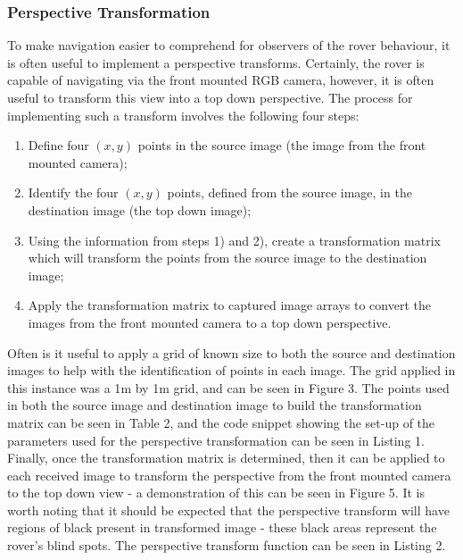 \documentclass[a4paper]{article}
\begin{document}
\subsubsection{Perspective Transformation}
To make navigation easier to comprehend for observers of the rover behaviour, it is often useful to implement a perspective transforms. Certainly, the rover is capable of navigating via the front mounted RGB camera, however, it is often useful to transform this view into a top down perspective. The process for implementing such a transform involves the following four steps:
\begin{enumerate}
\item Define four $(x,y)$ points in the source image (the image from the front mounted camera);
\item Identify the four $(x,y)$ points, defined from the source image, in the destination image (the top down image);
\item Using the information from steps 1) and 2), create a transformation matrix which will transform the points from the source image to the destination image;
\item Apply the transformation matrix to captured image arrays to convert the images from the front mounted camera to a top down perspective.
\end{enumerate}  

Often is it useful to apply a grid of known size to both the source and destination images to help with the identification of points in each image. The grid applied in this instance was a 1$\si{\meter}$ by 1$\si{\meter}$ grid, and can be seen in Figure 3. The points used in both the source image and destination image to build the transformation matrix can be seen in Table 2, and the code snippet showing the set-up of the parameters used for the perspective transformation can be seen in Listing 1. Finally, once the transformation matrix is determined, then it can be applied to each received image to transform the perspective from the front mounted camera to the top down view - a demonstration of this can be seen in Figure 5. It is worth noting that it should be expected that the perspective transform will have regions of black present in transformed image - these black areas represent the rover's blind spots. The perspective transform function can be seen in Listing 2.
\end{document}
